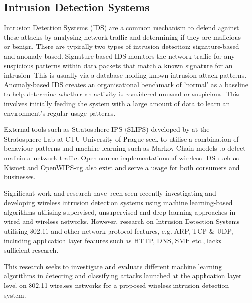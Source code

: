 
\subsection{Intrusion Detection Systems}

\smallskip

Intrusion Detection Systems (IDS) are a common mechanism to defend against these attacks by analysing network traffic and determining if they are malicious or benign. There are typically two types of intrusion detection: signature-based and anomaly-based. Signature-based IDS monitors the network traffic for any suspicious patterns within data packets that match a known signature for an intrusion. This is usually via a database holding known intrusion attack patterns. Anomaly-based IDS creates an organisational benchmark of 'normal' as a baseline to help determine whether an activity is considered unusual or suspicious. This involves initially feeding the system with a large amount of data to learn an environment's regular usage patterns. 

External tools such as Stratosphere IPS (SLIPS) developed by \textcite{garcia_2015_slips} at the Stratosphere Lab at CTU University of Prague seek to utilise a combination of behaviour patterns and machine learning such as Markov Chain models to detect malicious network traffic. Open-source implementations of wireless IDS such as Kismet \parencite{kismet_2002_kismet} and OpenWIPS-ng \parencite{thomasdotreppe_2011_openwipsng} also exist and serve a usage for both consumers and businesses.

\medskip
Significant work and research have been seen recently investigating and developing wireless intrusion detection systems using machine learning-based algorithms utilising supervised, unsupervised and deep learning approaches in wired and wireless networks. However, research on Intrusion Detection Systems utilising 802.11 and other network protocol features, e.g. ARP, TCP \& UDP, including application layer features such as HTTP, DNS, SMB etc., lacks sufficient research.

This research seeks to investigate and evaluate different machine learning algorithms in detecting and classifying attacks launched at the application layer level on 802.11 wireless networks for a proposed wireless intrusion detection system. 

